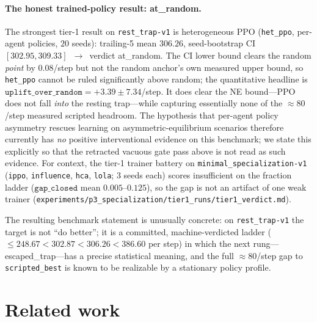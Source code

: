 \documentclass{anvil-paper}
\begin{document}
\paragraph{The honest trained-policy result: \textsf{at\_random}.}
The strongest tier-1 result on \texttt{rest\_trap-v1} is heterogeneous
PPO (\texttt{het\_ppo}, per-agent policies, $20$ seeds): trailing-5 mean
$306.26$, seed-bootstrap CI $[302.95, 309.33]$~$\to$~verdict
\textsf{at\_random}. The CI lower bound clears the random \emph{point}
by $0.08$/step but not the random anchor's own measured upper bound, so
\texttt{het\_ppo} cannot be ruled significantly above random; the
quantitative headline is
$\texttt{uplift\_over\_random}{=}{+}3.39\pm 7.34$/step. It does clear
the NE bound---PPO does not fall \emph{into} the resting trap---while
capturing essentially none of the ${\approx}80$/step measured scripted
headroom. The hypothesis that per-agent policy asymmetry rescues
learning on asymmetric-equilibrium scenarios therefore currently has
\emph{no} positive interventional evidence on this benchmark; we state
this explicitly so that the retracted vacuous gate pass above is not
read as such evidence. For context, the tier-1 trainer battery on
\texttt{minimal\_specialization-v1} (\texttt{ippo}, \texttt{influence},
\texttt{hca}, \texttt{lola}; $3$ seeds each) scores
\textsf{insufficient} on the fraction ladder
($\texttt{gap\_closed}$ mean $0.005$--$0.125$), so the gap is not an
artifact of one weak trainer
(\texttt{experiments/p3\_specialization/tier1\_runs/tier1\_verdict.md}).

The resulting benchmark statement is unusually concrete: on
\texttt{rest\_trap-v1} the target is not ``do better''; it is a
committed, machine-verdicted ladder
(${\leq}248.67 < 302.87 < 306.26 < 386.60$ per step) in which the next
rung---\textsf{escaped\_trap}---has a precise statistical meaning, and
the full ${\approx}80$/step gap to \texttt{scripted\_best} is known to
be realizable by a stationary policy profile.

\section{Related work}
\label{sec:related}
\end{document}
